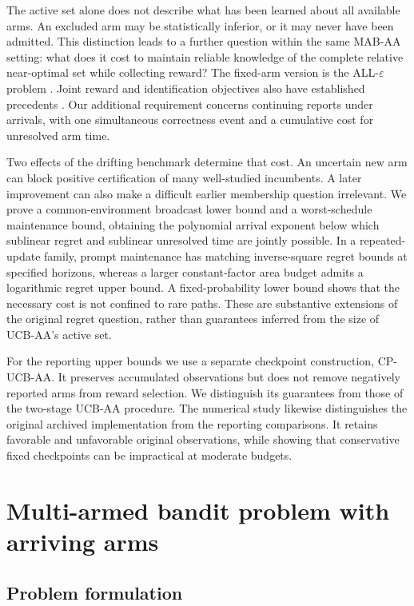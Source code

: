 \documentclass[11pt]{article}
\begin{document}
The active set alone does not describe what has been learned about all
available arms. An excluded arm may be statistically inferior, or it may never
have been admitted. This distinction leads to a further question within the
same MAB-AA setting: what does it cost to maintain reliable knowledge of the
complete relative near-optimal set while collecting reward? The fixed-arm
version is the ALL-$\varepsilon$ problem \citep{mason2020}. Joint reward and
identification objectives also have established precedents
\citep{degenne2019,yang2026,cho2025}. Our additional requirement concerns
continuing reports under arrivals, with one simultaneous correctness event and
a cumulative cost for unresolved arm time.

Two effects of the drifting benchmark determine that cost. An uncertain new
arm can block positive certification of many well-studied incumbents. A later
improvement can also make a difficult earlier membership question irrelevant.
We prove a common-environment broadcast lower bound and a worst-schedule
maintenance bound, obtaining the polynomial arrival exponent below which
sublinear regret and sublinear unresolved time are jointly possible. In a
repeated-update family, prompt maintenance has matching inverse-square regret
bounds at specified horizons, whereas a larger constant-factor area budget
admits a logarithmic regret upper bound. A fixed-probability lower bound shows
that the necessary cost is not confined to rare paths. These are substantive
extensions of the original regret question, rather than guarantees inferred
from the size of UCB-AA's active set.

For the reporting upper bounds we use a separate checkpoint construction,
CP-UCB-AA. It preserves accumulated observations but does not remove negatively
reported arms from reward selection. We distinguish its guarantees from those
of the two-stage UCB-AA procedure. The numerical study likewise distinguishes
the original archived implementation from the reporting comparisons. It
retains favorable and unfavorable original observations, while showing that
conservative fixed checkpoints can be impractical at moderate budgets.

\section{Multi-armed bandit problem with arriving arms}
\label{sec:model}
\label{sec:problem}
\subsection{Problem formulation}
\end{document}
